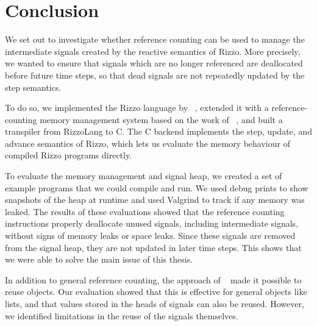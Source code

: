 \clearpage
\section{Conclusion}\label{section:conclusion}


We set out to investigate whether reference counting can be used to manage the intermediate signals created by the reactive semantics of Rizzo. 
More precisely, we wanted to ensure that signals which are no longer referenced are deallocated before future time steps, so that dead signals are not repeatedly updated by the step semantics.

To do so, we implemented the Rizzo language by \citeauthor*{rizzo_modal_2025}~\cite{rizzo_modal_2025}, extended it with a
reference-counting memory management system based on the work of \citeauthor*{ullrich_counting_2021}~\cite{ullrich_counting_2021}, and built a transpiler from RizzoLang to C. The C backend implements the step, update, and advance semantics of Rizzo, which lets us evaluate the memory behaviour of compiled Rizzo programs directly.


To evaluate the memory management and signal heap, we created a set of example programs that we could compile and run. We used debug prints to show snapshots of the heap at runtime and used Valgrind to track if any memory was leaked.
The results of these evaluations showed that the reference counting instructions properly deallocate unused signals, including intermediate signals, without signs of memory leaks or space leaks. Since these signals are removed from the signal heap, they are not updated in later time steps. This shows that we were able to solve the main issue of this thesis.

In addition to general reference counting, the approach of \citeauthor*{ullrich_counting_2021}~\cite{ullrich_counting_2021} made it possible to reuse objects. Our evaluation showed that this is effective for general objects like lists, and that values stored in the heads of signals can also be reused. However, we identified limitations in the reuse of the signals themselves.

